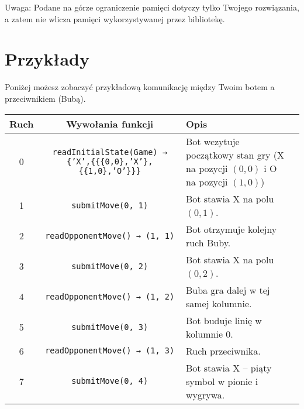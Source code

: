 \documentclass{spiral}
\begin{document}
\noindent Uwaga: Podane na górze ograniczenie pamięci dotyczy tylko Twojego
rozwiązania, a zatem nie wlicza pamięci wykorzystywanej przez bibliotekę.

\section{Przykłady}

\noindent Poniżej możesz zobaczyć przykładową komunikację między Twoim botem a
przeciwnikiem (Bubą).

\begin{center}
	\renewcommand{\arraystretch}{1.4}
	\begin{tabular}{|c|c|p{6cm}|p{4.5cm}|}
		\hline
		\textbf{Ruch}                                &
		\textbf{Wywołania funkcji}
		                                             & \textbf{Opis}
		\\
		\hline
		0                                            &
		\texttt{readInitialState(Game) →
		\{'X',\{\{\{0,0\},'X'\},\{\{1,0\},'O'\}\}\}} & Bot wczytuje
		początkowy stan gry
		(X na pozycji $(0,0)$ i O na pozycji $(1,0)$)
		\\
		\hline
		1                                            &
		\texttt{submitMove(0, 1)}
		                                             & Bot stawia X na
		polu
		$(0, 1)$.
		\\
		\hline
		2                                            &
		\texttt{readOpponentMove() → (1, 1)}
		                                             & Bot otrzymuje
		kolejny ruch Buby.
		\\
		\hline
		3                                            &
		\texttt{submitMove(0, 2)}
		                                             & Bot stawia X na
		polu
		$(0, 2)$.
		\\
		\hline
		4                                            &
		\texttt{readOpponentMove() → (1, 2)}
		                                             & Buba gra dalej w
		tej samej kolumnie.
		\\
		\hline
		5                                            &
		\texttt{submitMove(0, 3)}
		                                             & Bot buduje linię
		w kolumnie 0.
		\\
		\hline
		6                                            &
		\texttt{readOpponentMove() → (1, 3)}
		                                             & Ruch
		przeciwnika.
		\\
		\hline
		7                                            &
		\texttt{submitMove(0, 4)}
		                                             & Bot stawia X –
		piąty symbol w pionie i wygrywa.
		\\
		\hline
	\end{tabular}
\end{center}
\end{document}
